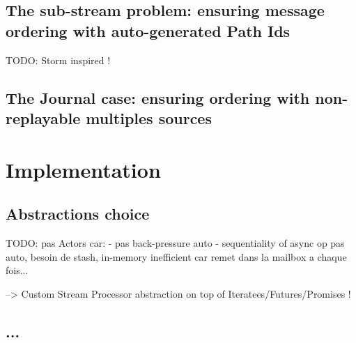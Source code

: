 \subsection{The sub-stream problem: ensuring message ordering with auto-generated Path Ids}


TODO: Storm inspired !


\subsection{The Journal case: ensuring ordering with non-replayable multiples sources}


\section{Implementation}

\subsection{Abstractions choice}

TODO: pas Actors car:
- pas back-pressure auto
- sequentiality of async op pas auto, besoin de stash, in-memory inefficient car remet dans la mailbox a chaque fois...

--> Custom Stream Processor abstraction on top of Iteratees/Futures/Promises !

\subsection{...}



